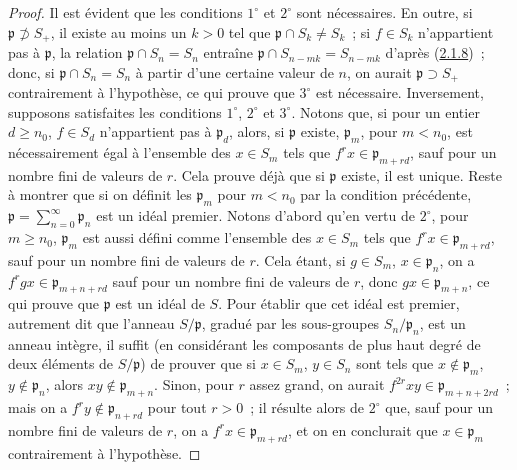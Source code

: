 \begin{proof}
Il est évident que les conditions $1^\circ$ et $2^\circ$ sont nécessaires.
En outre, si $\mathfrak{p}\not\supset S_+$, il existe au moins un $k>0$ tel que
$\mathfrak{p}\cap S_k\neq S_k$~; si $f\in S_k$ n'appartient pas à
$\mathfrak{p}$, la relation $\mathfrak{p}\cap S_n=S_n$ entraîne
$\mathfrak{p}\cap S_{n-mk}=S_{n-mk}$ d'après
(\hyperref[II.2.1.8-fr]{2.1.8})~; donc, si
$\mathfrak{p}\cap S_n=S_n$ à partir d'une certaine valeur de $n$, on aurait
$\mathfrak{p}\supset S_+$ contrairement à l'hypothèse, ce qui prouve que
$3^\circ$ est nécessaire. Inversement, supposons satisfaites les conditions
$1^\circ$, $2^\circ$ et $3^\circ$. Notons que, si pour un entier
$d\geq n_0$, $f\in S_d$ n'appartient pas à $\mathfrak{p}_d$, alors, si
$\mathfrak{p}$ existe, $\mathfrak{p}_m$, pour $m<n_0$, est nécessairement
égal à l'ensemble des $x\in S_m$ tels que
$f^rx\in\mathfrak{p}_{m+rd}$, sauf pour un nombre fini de valeurs de $r$.
Cela prouve déjà que si $\mathfrak{p}$ existe, il est unique. Reste à montrer
que si on définit les $\mathfrak{p}_m$ pour $m<n_0$ par la condition
précédente, $\mathfrak{p}=\sum_{n=0}^{\infty}\mathfrak{p}_n$ est un idéal
premier. Notons d'abord qu'en vertu de $2^\circ$, pour $m\geq n_0$,
$\mathfrak{p}_m$ est aussi défini comme l'ensemble des $x\in S_m$ tels que
$f^rx\in\mathfrak{p}_{m+rd}$, sauf pour un nombre fini de valeurs de $r$.
Cela
étant, si $g\in S_m$, $x\in\mathfrak{p}_n$, on a
$f^rgx\in\mathfrak{p}_{m+n+rd}$ sauf pour un nombre fini de valeurs de $r$,
donc $gx\in\mathfrak{p}_{m+n}$, ce qui prouve que $\mathfrak{p}$ est un
idéal de $S$. Pour établir que cet idéal est premier, autrement dit que
l'anneau $S/\mathfrak{p}$, gradué par les sous-groupes
$S_n/\mathfrak{p}_n$, est un anneau intègre, il suffit (en considérant les
composants de plus haut degré de deux éléments de $S/\mathfrak{p}$) de
prouver que si $x\in S_m$, $y\in S_n$ sont tels que
$x\notin\mathfrak{p}_m$, $y\notin\mathfrak{p}_n$, alors
$xy\notin\mathfrak{p}_{m+n}$. Sinon, pour $r$ assez grand, on aurait
$f^{2r}xy\in\mathfrak{p}_{m+n+2rd}$~; mais on a
$f^ry\notin\mathfrak{p}_{n+rd}$ pour tout $r>0$~; il résulte alors de
$2^\circ$ que, sauf pour un nombre fini de valeurs de $r$, on a
$f^rx\in\mathfrak{p}_{m+rd}$, et on en conclurait que
$x\in\mathfrak{p}_m$ contrairement à l'hypothèse.
\end{proof}

